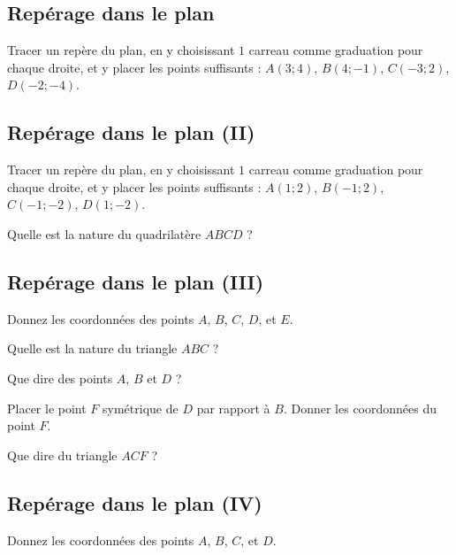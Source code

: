 \documentclass[12 pt]{article}
\theoremstyle{plain}
\newcounter{n}
\numberwithin{n}{section}
\begin{document}
\subsection{Repérage dans le plan}

Tracer un repère du plan, en y choisissant $1$ carreau comme graduation pour chaque droite, et y placer les points 
suffisants : $ A(3 ; 4)$, $B(4; -1)$, $C(-3; 2)$, $D(-2; -4)$. 

\subsection{Repérage dans le plan (II)}

Tracer un repère du plan, en y choisissant $1$ carreau comme graduation pour chaque droite, et y placer les points 
suffisants : $ A(1 ; 2)$, $B(-1; 2)$, $C(-1; -2)$, $D(1; -2)$. 

Quelle est la nature du quadrilatère $ABCD$ ? 
\newpage

\subsection{Repérage dans le plan (III)}
Donnez les coordonnées des points $A$, $B$, $C$, $D$, et $E$. 

Quelle est la nature du triangle $ABC$ ?

Que dire des points $A$, $B$ et $D$ ?

Placer le point $F$ symétrique de $D$ par rapport à $B$. Donner les coordonnées du point $F$. 

Que dire du triangle $ACF$ ?
\begin{figure}[H]
\end{figure}
\newpage
\subsection{Repérage dans le plan (IV)}
Donnez les coordonnées des points $A$, $B$, $C$, et $D$. 
\end{document}
